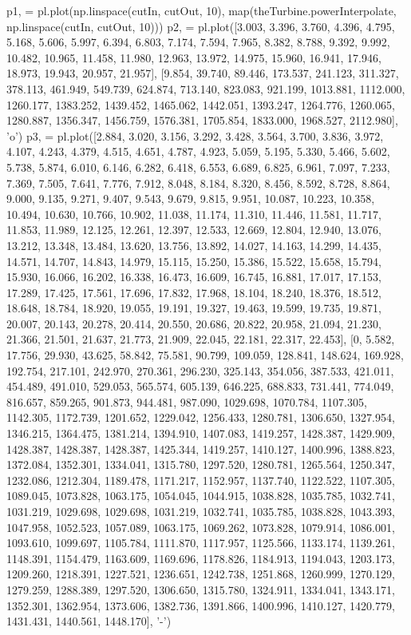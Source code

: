 \begin{pythoncode}
p1, = pl.plot(np.linspace(cutIn, cutOut, 10), map(theTurbine.powerInterpolate, np.linspace(cutIn, cutOut, 10)))
p2, = pl.plot([3.003, 3.396, 3.760, 4.396, 4.795, 5.168, 5.606, 5.997, 6.394, 6.803, 7.174, 7.594, 7.965, 8.382, 8.788, 9.392, 9.992, 10.482, 10.965, 11.458, 11.980, 12.963, 13.972, 14.975, 15.960, 16.941, 17.946, 18.973, 19.943, 20.957, 21.957], [9.854, 39.740, 89.446, 173.537, 241.123, 311.327, 378.113, 461.949, 549.739, 624.874, 713.140, 823.083, 921.199, 1013.881, 1112.000, 1260.177, 1383.252, 1439.452, 1465.062, 1442.051, 1393.247, 1264.776, 1260.065, 1280.887, 1356.347, 1456.759, 1576.381, 1705.854, 1833.000, 1968.527, 2112.980], 'o')
p3, = pl.plot([2.884, 3.020, 3.156, 3.292, 3.428, 3.564, 3.700, 3.836, 3.972, 4.107, 4.243, 4.379, 4.515, 4.651, 4.787, 4.923, 5.059, 5.195, 5.330, 5.466, 5.602, 5.738, 5.874, 6.010, 6.146, 6.282, 6.418, 6.553, 6.689, 6.825, 6.961, 7.097, 7.233, 7.369, 7.505, 7.641, 7.776, 7.912, 8.048, 8.184, 8.320, 8.456, 8.592, 8.728, 8.864, 9.000, 9.135, 9.271, 9.407, 9.543, 9.679, 9.815, 9.951, 10.087, 10.223, 10.358, 10.494, 10.630, 10.766, 10.902, 11.038, 11.174, 11.310, 11.446, 11.581, 11.717, 11.853, 11.989, 12.125, 12.261, 12.397, 12.533, 12.669, 12.804, 12.940, 13.076, 13.212, 13.348, 13.484, 13.620, 13.756, 13.892, 14.027, 14.163, 14.299, 14.435, 14.571, 14.707, 14.843, 14.979, 15.115, 15.250, 15.386, 15.522, 15.658, 15.794, 15.930, 16.066, 16.202, 16.338, 16.473, 16.609, 16.745, 16.881, 17.017, 17.153, 17.289, 17.425, 17.561, 17.696, 17.832, 17.968, 18.104, 18.240, 18.376, 18.512, 18.648, 18.784, 18.920, 19.055, 19.191, 19.327, 19.463, 19.599, 19.735, 19.871, 20.007, 20.143, 20.278, 20.414, 20.550, 20.686, 20.822, 20.958, 21.094, 21.230, 21.366, 21.501, 21.637, 21.773, 21.909, 22.045, 22.181, 22.317, 22.453], [0, 5.582, 17.756, 29.930, 43.625, 58.842, 75.581, 90.799, 109.059, 128.841, 148.624, 169.928, 192.754, 217.101, 242.970, 270.361, 296.230, 325.143, 354.056, 387.533, 421.011, 454.489, 491.010, 529.053, 565.574, 605.139, 646.225, 688.833, 731.441, 774.049, 816.657, 859.265, 901.873, 944.481, 987.090, 1029.698, 1070.784, 1107.305, 1142.305, 1172.739, 1201.652, 1229.042, 1256.433, 1280.781, 1306.650, 1327.954, 1346.215, 1364.475, 1381.214, 1394.910, 1407.083, 1419.257, 1428.387, 1429.909, 1428.387, 1428.387, 1428.387, 1425.344, 1419.257, 1410.127, 1400.996, 1388.823, 1372.084, 1352.301, 1334.041, 1315.780, 1297.520, 1280.781, 1265.564, 1250.347, 1232.086, 1212.304, 1189.478, 1171.217, 1152.957, 1137.740, 1122.522, 1107.305, 1089.045, 1073.828, 1063.175, 1054.045, 1044.915, 1038.828, 1035.785, 1032.741, 1031.219, 1029.698, 1029.698, 1031.219, 1032.741, 1035.785, 1038.828, 1043.393, 1047.958, 1052.523, 1057.089, 1063.175, 1069.262, 1073.828, 1079.914, 1086.001, 1093.610, 1099.697, 1105.784, 1111.870, 1117.957, 1125.566, 1133.174, 1139.261, 1148.391, 1154.479, 1163.609, 1169.696, 1178.826, 1184.913, 1194.043, 1203.173, 1209.260, 1218.391, 1227.521, 1236.651, 1242.738, 1251.868, 1260.999, 1270.129, 1279.259, 1288.389, 1297.520, 1306.650, 1315.780, 1324.911, 1334.041, 1343.171, 1352.301, 1362.954, 1373.606, 1382.736, 1391.866, 1400.996, 1410.127, 1420.779, 1431.431, 1440.561, 1448.170], '-')


\end{pythoncode}

